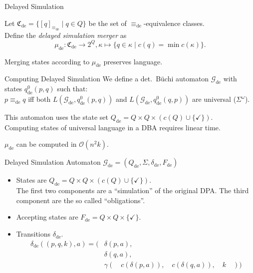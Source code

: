 \begin{frame}{Delayed Simulation}
\begin{defn}
	Let $\mathfrak{C}_\text{de} = \{ [q]_{\equiv_\text{de}} \mid q \in Q \}$ be the set of $\equiv_\text{de}$-equivalence classes. \\
	Define the \emph{delayed simulation merger} as $$\mu_\text{de} : \mathfrak{C}_\text{de} \rightarrow 2^Q, \kappa \mapsto \{ q \in \kappa \mid c(q) = \min c(\kappa) \}.$$
\end{defn}

\begin{theorem}
	Merging states according to $\mu_\text{de}$ preserves language.
\end{theorem}
\end{frame}


\begin{frame}{Computing Delayed Simulation}
	We define a det.\ Büchi automaton $\mathcal{G}_\text{de}$ with states $q_\text{de}^0(p, q)$ such that: \\
	$p \equiv_\text{de} q$ iff both $L(\mathcal{G}_\text{de}, q_\text{de}^0(p, q))$ and $L(\mathcal{G}_\text{de}, q_\text{de}^0(q, p))$ are universal ($\Sigma^\omega$).
	
	\vspace{.5cm}
	
	This automaton uses the state set $Q_\text{de} = Q \times Q \times (c(Q) \cup \{\checkmark\})$. \\
	Computing states of universal language in a DBA requires linear time.
	
	\vspace{.5cm}
	
	\begin{theorem}
		$\mu_\text{de}$ can be computed in $\mathcal{O}(n^2 k)$.
	\end{theorem}
\end{frame}

\begin{frame}{Delayed Simulation Automaton}
$\mathcal{G}_\text{de} = (Q_\text{de}, \Sigma, \delta_\text{de}, F_\text{de})$

\begin{itemize}
	\item States are $Q_\text{de} = Q \times Q \times (c(Q) \cup \{\checkmark\})$. \\
The first two components are a \enquote{simulation} of the original DPA. The third component are the so called \enquote{obligations}.
	\item Accepting states are $F_\text{de} = Q \times Q \times \{\checkmark\}$.
	\item Transitions $\delta_\text{de}$.
\begin{align*}
	\delta_\text{de}((p, q, k), a) = (& \delta(p, a), \\
									& \delta(q, a), \\
									& \gamma( \quad c(\delta(p, a)), \quad c(\delta(q, a)), \quad k \quad ))
\end{align*}
\end{itemize}

\end{frame}


